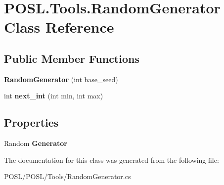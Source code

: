 \hypertarget{classPOSL_1_1Tools_1_1RandomGenerator}{}\section{P\+O\+S\+L.\+Tools.\+Random\+Generator Class Reference}
\label{classPOSL_1_1Tools_1_1RandomGenerator}
\subsection*{Public Member Functions}
\begin{DoxyCompactItemize}
\item 
\mbox{\label{classPOSL_1_1Tools_1_1RandomGenerator_a7b4d1ef90a390d662ee0b3f4e6203107}} 
{\bfseries Random\+Generator} (int base\+\_\+seed)
\item 
\mbox{\label{classPOSL_1_1Tools_1_1RandomGenerator_ade93a3711c54fc63ab0ac42f48310897}} 
int {\bfseries next\+\_\+int} (int min, int max)
\end{DoxyCompactItemize}
\subsection*{Properties}
\begin{DoxyCompactItemize}
\item 
\mbox{\label{classPOSL_1_1Tools_1_1RandomGenerator_a36be1aecb6764894dc863b91f011ef72}} 
Random {\bfseries Generator}
\end{DoxyCompactItemize}


The documentation for this class was generated from the following file\+:\begin{DoxyCompactItemize}
\item 
P\+O\+S\+L/\+P\+O\+S\+L/\+Tools/Random\+Generator.\+cs\end{DoxyCompactItemize}
